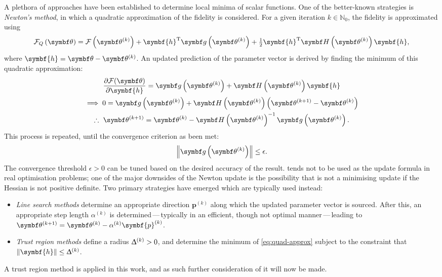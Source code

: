 A plethora of approaches have been established to determine local minima of
scalar functions. One of the better-known strategies is \emph{Newton's method},
in which a quadratic approximation of the fidelity is considered.
For a given iteration $k \in \mathbb{N}_0$, the fidelity is approximated using
\begin{equation}
    \FQth =
        \Fthk +
        \symbf{h}\T \bdgthk +
        \tfrac{1}{2} \symbf{h}^{\mathrm{T}} \bdHthk \symbf{h},
    \label{eq:quad-approx}
\end{equation}
where $\symbf{h} = \bth - \bthk$.  An updated prediction of the parameter
vector is derived by finding the minimum of this quadratic approximation:
\begin{gather}
    \frac{\partial \Fth}{\partial \symbf{h}} =
        \bdgthk + \bdHthk \symbf{h} \notag\\
    \implies 0 = \bdgthk + \bdHthk \left(\bthkplusone - \bthk\right) \notag\\
    \therefore\ \bthkplusone =
        \bthk - \bdHthk^{-1}
        \bdgthk.\label{eq:newton-update}
\end{gather}
This process is repeated, until the convergence criterion as been met:
\begin{equation}
    \left\lVert \bdgthk \right\rVert \leq \epsilon.
\end{equation}
The convergence threshold $\epsilon > 0$ can be tuned based on the desired
accuracy of the result.
 tends not to be used as the update formula in real
optimisation problems; one of the major downsides of the Newton update is the
possibility that is not a minimising update if the Hessian is not positive
definite. Two primary strategies have emerged which are typically used instead:
\begin{itemize}
    \item \emph{Line search methods}\cite[Chapter 3]{Nocedal2006} determine an
        appropriate direction $\symbf{p}^{(k)}$ along which the updated
        parameter vector is sourced.  After this, an appropriate step length
        $\alpha^{(k)}$ is determined\,---\,typically in an efficient, though not
        optimal manner\,---\,leading to $\bthkplusone = \bthk - \alpha^{(k)}\symbf{p}^{(k)}$.
    \item \emph{Trust region methods}\cite[Chapter 4]{Nocedal2006} define a
        radius $\Updelta^{(k)} > 0$, and determine the minimum of
        \cref{eq:quad-approx} subject to the constraint that
        $\left\lVert\symbf{h}\right\rVert \leq \Updelta^{(k)}$.
\end{itemize}
A trust region method is applied in this work, and as such further
consideration of it will now be made.

